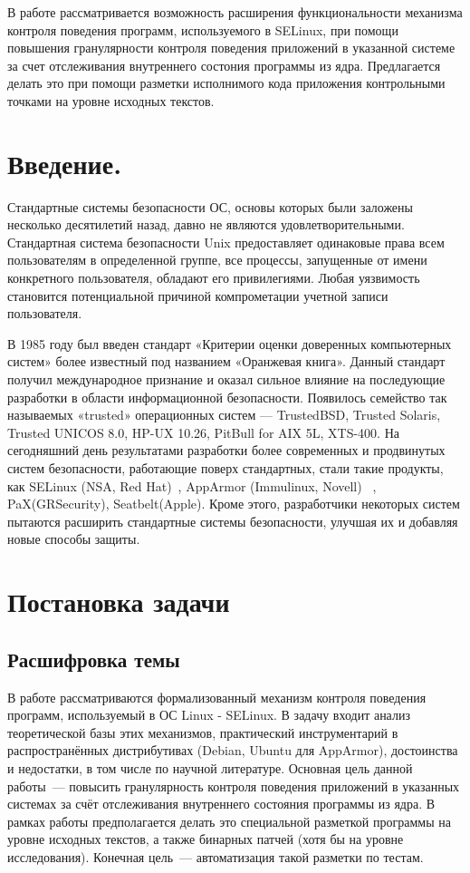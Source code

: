 {} 

{\large В работе рассматривается возможность расширения функциональности 
механизма контроля поведения программ, используемого в SELinux, при 
помощи повышения гранулярности контроля поведения приложений
в указанной системе за счет отслеживания внутреннего состония
программы из ядра. Предлагается делать это при помощи
разметки исполнимого кода приложения контрольными точками 
на уровне исходных текстов. 
}

\newpage
\tableofcontents
\newpage

\bigskip 
\section{Введение.}

Стандартные системы безопасности ОС, основы которых 
были заложены несколько десятилетий назад, давно не 
являются удовлетворительными. Стандартная система 
безопасности Unix предоставляет одинаковые права всем 
пользователям в определенной группе, все процессы, 
запущенные от имени конкретного пользователя, обладают 
его привилегиями. Любая уязвимость становится 
потенциальной причиной компрометации учетной записи 
пользователя. 

В 1985 году был введен стандарт «Критерии 
оценки доверенных компьютерных систем» более известный 
под названием «Оранжевая книга». Данный стандарт получил 
международное признание и оказал сильное влияние на 
последующие разработки в области информационной безопасности. 
Появилось семейство так называемых «trusted» операционных 
систем — TrustedBSD, Trusted Solaris, Trusted UNICOS 8.0, 
HP-UX 10.26, PitBull for AIX 5L, XTS-400. На сегодняшний 
день результатами разработки 
более современных и продвинутых систем безопасности, 
работающие поверх стандартных, стали такие продукты, как 
SELinux (NSA, Red Hat)~\cite{SEOF}, AppArmor (Immulinux, Novell) 
~\cite{AppArmor},
PaX(GRSecurity)\cite{pax}, Seatbelt(Apple). Кроме этого, разработчики 
некоторых систем пытаются расширить стандартные системы 
безопасности, улучшая их и добавляя новые способы защиты.
 


\section{Постановка задачи}
\subsection{Расшифровка темы}
В работе рассматриваются формализованный 
механизм контроля поведения программ, 
используемый в ОС Linux - SELinux.
В задачу входит анализ теоретической базы 
этих механизмов, практический инструментарий
в распространённых дистрибутивах (Debian, 
Ubuntu для AppArmor), достоинства и 
недостатки, в том числе по научной 
литературе. Основная цель данной работы~--- 
повысить гранулярность контроля поведения 
приложений в указанных системах за счёт 
отслеживания внутреннего состояния программы 
из ядра. В рамках работы предполагается делать 
это специальной разметкой программы на уровне 
исходных текстов, а также бинарных патчей (хотя 
бы на уровне исследования). Конечная цель~--- 
автоматизация такой разметки по тестам.

